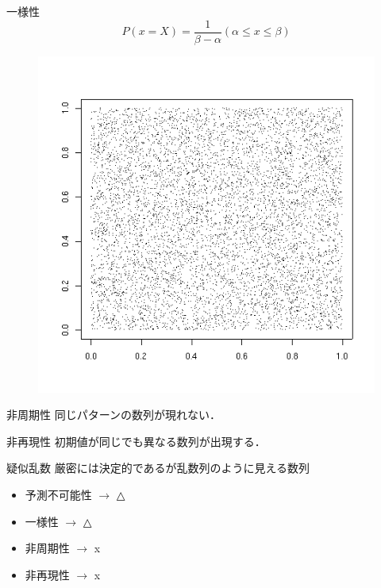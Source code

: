 \documentclass[dvipdfmx,xcolor={svgnames},notes=only]{beamer}
\begin{document}
    \begin{frame}{一様性}
      \begin{equation*}
        P(x=X) = \frac{1}{\beta - \alpha} (\alpha \leq x \leq \beta)
      \end{equation*}
      \begin{figure}[htbp]
        \centering
        \includegraphics[scale=0.3]{MTrand.png}
      \end{figure}
    \end{frame}

    \begin{frame}{非周期性}
      同じパターンの数列が現れない．
    \end{frame}

    \begin{frame}{非再現性}
      初期値が同じでも異なる数列が出現する．
    \end{frame}

    \begin{frame}{疑似乱数}
      厳密には決定的であるが乱数列のように見える数列
      \begin{itemize}
        \item 予測不可能性 $\rightarrow$ △
        \item 一様性 $\rightarrow$ △
        \item 非周期性 $\rightarrow$ x
        \item 非再現性 $\rightarrow$ x
      \end{itemize}
    \end{frame}
\end{document}
